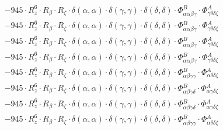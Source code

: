 \documentclass{article}
\begin{document}
\begin{subequations}
\begin{gather}
\begin{array}{c}
 \\[0.2em] 		 - 945 \cdot R_{z}^{6} \cdot R_{\beta{}} \cdot R_{\zeta{}} \cdot \delta{}\left(\alpha{}, \alpha{}\right) \cdot \delta{}\left(\gamma{}, \gamma{}\right) \cdot \delta{}\left(\delta{}, \delta{}\right) \cdot \Phi{}^{B}_{\alpha{}\alpha{}\beta{}\gamma{}} \cdot \Phi{}^{A}_{\gamma{}\delta{}\delta{}\zeta{}} 
 \\[0.2em] 		 - 945 \cdot R_{z}^{6} \cdot R_{\beta{}} \cdot R_{\zeta{}} \cdot \delta{}\left(\alpha{}, \alpha{}\right) \cdot \delta{}\left(\gamma{}, \gamma{}\right) \cdot \delta{}\left(\delta{}, \delta{}\right) \cdot \Phi{}^{B}_{\alpha{}\alpha{}\beta{}\gamma{}} \cdot \Phi{}^{A}_{\gamma{}\delta{}\delta{}\zeta{}} 
 \\[0.2em] 		 - 945 \cdot R_{z}^{6} \cdot R_{\beta{}} \cdot R_{\zeta{}} \cdot \delta{}\left(\alpha{}, \alpha{}\right) \cdot \delta{}\left(\gamma{}, \gamma{}\right) \cdot \delta{}\left(\delta{}, \delta{}\right) \cdot \Phi{}^{B}_{\alpha{}\alpha{}\beta{}\gamma{}} \cdot \Phi{}^{A}_{\gamma{}\delta{}\delta{}\zeta{}} 
 \\[0.2em] 		 - 945 \cdot R_{z}^{6} \cdot R_{\beta{}} \cdot R_{\zeta{}} \cdot \delta{}\left(\alpha{}, \alpha{}\right) \cdot \delta{}\left(\gamma{}, \gamma{}\right) \cdot \delta{}\left(\delta{}, \delta{}\right) \cdot \Phi{}^{B}_{\alpha{}\alpha{}\beta{}\gamma{}} \cdot \Phi{}^{A}_{\gamma{}\delta{}\delta{}\zeta{}} 
 \\[0.2em] 		 - 945 \cdot R_{z}^{6} \cdot R_{\beta{}} \cdot R_{\zeta{}} \cdot \delta{}\left(\alpha{}, \alpha{}\right) \cdot \delta{}\left(\gamma{}, \gamma{}\right) \cdot \delta{}\left(\delta{}, \delta{}\right) \cdot \Phi{}^{B}_{\alpha{}\beta{}\gamma{}\gamma{}} \cdot \Phi{}^{A}_{\alpha{}\delta{}\delta{}\zeta{}} 
 \\[0.2em] 		 - 945 \cdot R_{z}^{6} \cdot R_{\beta{}} \cdot R_{\zeta{}} \cdot \delta{}\left(\alpha{}, \alpha{}\right) \cdot \delta{}\left(\gamma{}, \gamma{}\right) \cdot \delta{}\left(\delta{}, \delta{}\right) \cdot \Phi{}^{B}_{\alpha{}\beta{}\gamma{}\delta{}} \cdot \Phi{}^{A}_{\alpha{}\gamma{}\delta{}\zeta{}} 
 \\[0.2em] 		 - 945 \cdot R_{z}^{6} \cdot R_{\beta{}} \cdot R_{\zeta{}} \cdot \delta{}\left(\alpha{}, \alpha{}\right) \cdot \delta{}\left(\gamma{}, \gamma{}\right) \cdot \delta{}\left(\delta{}, \delta{}\right) \cdot \Phi{}^{B}_{\alpha{}\beta{}\gamma{}\delta{}} \cdot \Phi{}^{A}_{\alpha{}\gamma{}\delta{}\zeta{}} 
 \\[0.2em] 		 - 945 \cdot R_{z}^{6} \cdot R_{\beta{}} \cdot R_{\zeta{}} \cdot \delta{}\left(\alpha{}, \alpha{}\right) \cdot \delta{}\left(\gamma{}, \gamma{}\right) \cdot \delta{}\left(\delta{}, \delta{}\right) \cdot \Phi{}^{B}_{\alpha{}\beta{}\gamma{}\gamma{}} \cdot \Phi{}^{A}_{\alpha{}\delta{}\delta{}\zeta{}} 

\end{array}
\end{gather}
\end{subequations}
\end{document}
